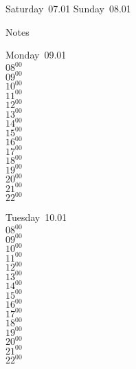 \documentclass[11pt,a4paper]{book}\usepackage[]{graphicx}\usepackage[]{color}
\begin{document}
\begin{weekendbox}
  Saturday~07.01
  \tcblower
  Sunday~08.01
\end{weekendbox} %
\begin{notebox}
  Notes
\end{notebox}
\clearpage
\begin{headerbox}
\end{headerbox}
\begin{weekdaybox}
  Monday~09.01\\
  { 
  \vfill
  $08^{00}$\\
$09^{00}$\\
$10^{00}$\\
$11^{00}$\\
$12^{00}$\\
$13^{00}$\\
$14^{00}$\\
$15^{00}$\\
$16^{00}$\\
$17^{00}$\\
$18^{00}$\\
$19^{00}$\\
$20^{00}$\\
$21^{00}$\\
$22^{00}$\\
  }
\end{weekdaybox}
\begin{weekdaybox}
  Tuesday~10.01\\
  { 
  \vfill
  $08^{00}$\\
$09^{00}$\\
$10^{00}$\\
$11^{00}$\\
$12^{00}$\\
$13^{00}$\\
$14^{00}$\\
$15^{00}$\\
$16^{00}$\\
$17^{00}$\\
$18^{00}$\\
$19^{00}$\\
$20^{00}$\\
$21^{00}$\\
$22^{00}$\\
  }
\end{weekdaybox}
\end{document}
